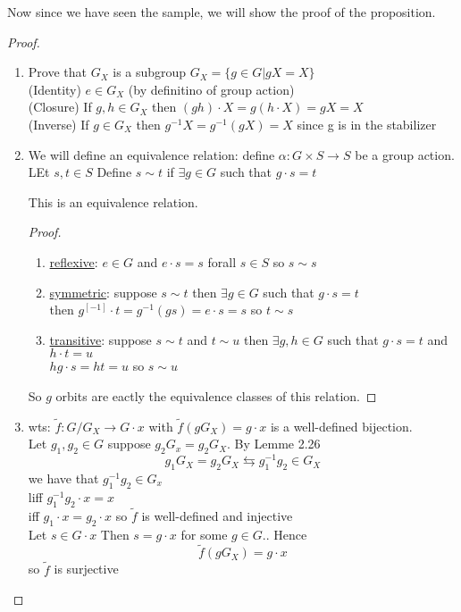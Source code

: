 \documentclass{article}
\begin{document}
Now since we have seen the sample, we will show the proof of the proposition. \begin{proof}
    \leavevmode \\ 
    \begin{enumerate}
        \item Prove that $G_X$ is a subgroup $G_X = \{g \in G | gX = X \}$ \\(Identity) $e \in G_X$ (by definitino of group action) \\ 
            (Closure) If $g,h \in G_X$ then $(gh) \cdot X = g(h\cdot X) = gX = X$  \\ 
            (Inverse) If $g \in G_X$ then $g^{-1}X = g^{-1}(gX) = X$  since g is in the stabilizer\\
        \item We will define an equivalence relation: define $\alpha: G \times S \to S $ be a group action. LEt $s,t \in S $ Define $s \sim t$ if $\exists g \in G$ such that $g \cdot s = t$ \\
        \begin{lemma}
            This is an equivalence relation. \begin{proof} \leavevmode \\
                \begin{enumerate}
                    \item \underline{reflexive}: $e \in G$ and $e \cdot s = s$ forall $s\in S$ so $s \sim s$
                    \item \underline{symmetric}: suppose $s \sim t$ then $\exists g \in G $ such that $g \cdot s  = t$ \\ then $g^[-1] \cdot t = g^{-1} (gs) = e\cdot s = s$ so $t \sim s$
                    \item \underline{transitive}: suppose $s \sim t $ and $t \sim u$ then $\exists g, h \in G$ such that $g\cdot s = t$ and $h \cdot t = u$ \\ $hg\cdot s = ht = u$ so $s \sim u$
                     
                \end{enumerate}
                So $g$ orbits are eactly the equivalence classes of this relation. 
            \end{proof}
        \end{lemma}
        \item wts: $\tilde{f}: G / G_X \to G\cdot x$ with $\tilde{f}(gG_X) = g \cdot x$ is a well-defined bijection. \\ 
        Let $g_1, g_2 \in G$ suppose $g_2 G_x = g_2 G_X$. By Lemme 2.26 $$g_1G_X = g_2G_X \leftrightarrows g_1^{-1}g_2 \in G_X$$ we have that $g_1^{-1} g_2 \in G_x $ \\ liff $g_1^{-1}g_2 \cdot x = x$ \\ iff $g_1 \cdot x = g_2 \cdot x$ so $\tilde{f}$ is well-defined and injective  \\ Let $s \in G\cdot x$ Then $s = g\cdot x$ for some $g \in G$.. Hence $$\tilde{f}(gG_X) = g\cdot x$$ so $\tilde{f}$ is surjective 

    \end{enumerate}
\end{proof}
\end{document}
